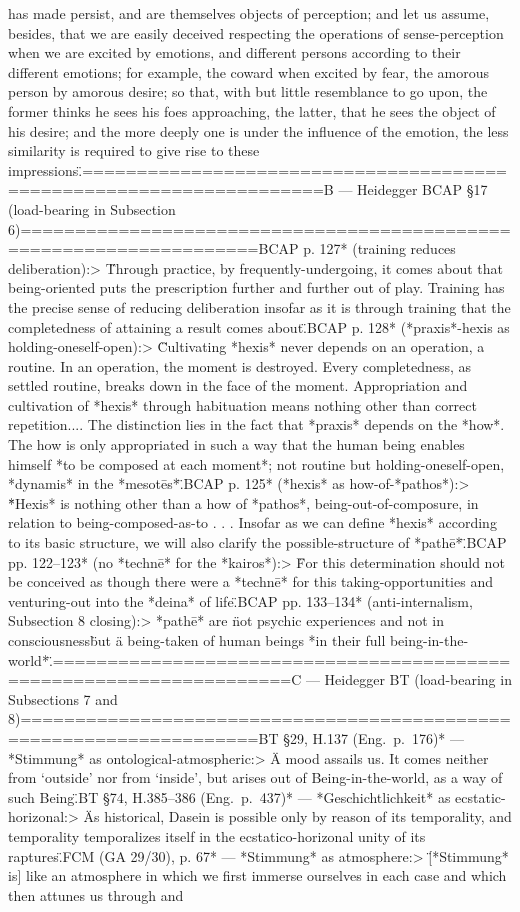{has made persist, and are themselves objects of perception; and let us assume, besides, that we are easily deceived respecting the operations of sense-perception when we are excited by emotions, and different persons according to their different emotions; for example, the coward when excited by fear, the amorous person by amorous desire; so that, with but little resemblance to go upon, the former thinks he sees his foes approaching, the latter, that he sees the object of his desire; and the more deeply one is under the influence of the emotion, the less similarity is required to give rise to these impressions.\"\n\n====================================================================\nSOURCE B — Heidegger BCAP §17 (load-bearing in Subsection 6)\n====================================================================\n\n*BCAP p. 127* (training reduces deliberation):\n> \"Through practice, by frequently-undergoing, it comes about that being-oriented puts the prescription further and further out of play. Training has the precise sense of reducing deliberation insofar as it is through training that the completedness of attaining a result comes about.\"\n\n*BCAP p. 128* (*praxis*-hexis as holding-oneself-open):\n> \"Cultivating *hexis* never depends on an operation, a routine. In an operation, the moment is destroyed. Every completedness, as settled routine, breaks down in the face of the moment. Appropriation and cultivation of *hexis* through habituation means nothing other than correct repetition.... The distinction lies in the fact that *praxis* depends on the *how*. The how is only appropriated in such a way that the human being enables himself *to be composed at each moment*; not routine but holding-oneself-open, *dynamis* in the *mesotēs*.\"\n\n*BCAP p. 125* (*hexis* as how-of-*pathos*):\n> \"*Hexis* is nothing other than a how of *pathos*, being-out-of-composure, in relation to being-composed-as-to . . . Insofar as we can define *hexis* according to its basic structure, we will also clarify the possible-structure of *pathē*.\"\n\n*BCAP pp. 122–123* (no *technē* for the *kairos*):\n> \"For this determination should not be conceived as though there were a *technē* for this taking-opportunities and venturing-out into the *deina* of life.\"\n\n*BCAP pp. 133–134* (anti-internalism, Subsection 8 closing):\n> *pathē* are \"not psychic experiences and not in consciousness\" but \"a being-taken of human beings *in their full being-in-the-world*.\"\n\n====================================================================\nSOURCE C — Heidegger BT (load-bearing in Subsections 7 and 8)\n====================================================================\n\n*BT §29, H.137 (Eng.~p.~176)* — *Stimmung* as ontological-atmospheric:\n> \"A mood assails us. It comes neither from `outside' nor from `inside', but arises out of Being-in-the-world, as a way of such Being.\"\n\n*BT §74, H.385–386 (Eng.~p.~437)* — *Geschichtlichkeit* as ecstatic-horizonal:\n> \"As historical, Dasein is possible only by reason of its temporality, and temporality temporalizes itself in the ecstatico-horizonal unity of its raptures.\"\n\n*FCM (GA 29/30), p. 67* — *Stimmung* as atmosphere:\n> \"[*Stimmung* is] like an atmosphere in which we first immerse ourselves in each case and which then attunes us through and }
